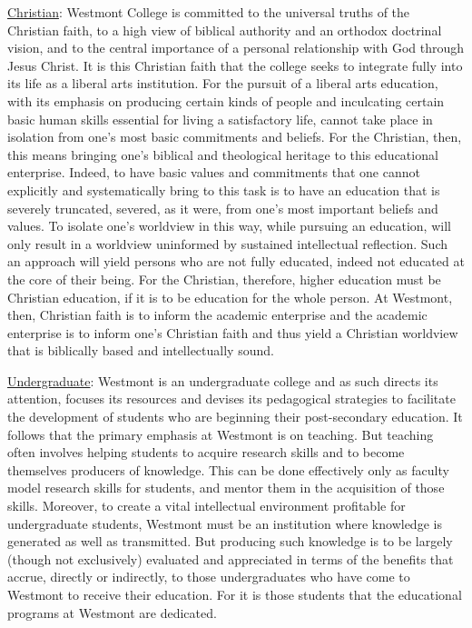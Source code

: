 \documentclass[letterpaper, 11pt]{article}
\begin{document}
			\underline{Christian}:  Westmont College is committed to the universal truths of the Christian faith, to a high view of biblical authority and an orthodox doctrinal vision, and to the central importance of a personal relationship with God through Jesus Christ.  It is this Christian faith that the college seeks to integrate fully into its life as a liberal arts institution.  For the pursuit of a liberal arts education, with its emphasis on producing certain kinds of people and inculcating certain basic human skills essential for living a satisfactory life, cannot take place in isolation from one's most basic commitments and beliefs.  For the Christian, then, this means bringing one's biblical and theological heritage to this educational enterprise. Indeed, to have basic values and commitments that one cannot explicitly and systematically bring to this task is to have an education that is severely truncated, severed, as it were, from one's most important beliefs and values.  To isolate one's worldview in this way, while pursuing an education, will only result in a worldview uninformed by sustained intellectual reflection.  Such an approach will yield persons who are not fully educated, indeed not educated at the core of their being.  For the Christian, therefore, higher education must be Christian education, if it is to be education for the whole person.  At Westmont, then, Christian faith is to inform the academic enterprise and the academic enterprise is to inform one's Christian faith and thus yield a Christian worldview that is biblically based and intellectually sound.

			\underline{Undergraduate}:  Westmont is an undergraduate college and as such directs its attention, focuses its resources and devises its pedagogical strategies to facilitate the development of students who are beginning their post-secondary education.  It follows that the primary emphasis at Westmont is on teaching.  But teaching often involves helping students to acquire research skills and to become themselves producers of knowledge.  This can be done effectively only as faculty model research skills for students, and mentor them in the acquisition of those skills.  Moreover, to create a vital intellectual environment profitable for undergraduate students, Westmont must be an institution where knowledge is generated as well as transmitted.  But producing such knowledge is to be largely (though not exclusively) evaluated and appreciated in terms of the benefits that accrue, directly or indirectly, to those undergraduates who have come to Westmont to receive their education. For it is those students that the educational programs at Westmont are dedicated.
\end{document}
